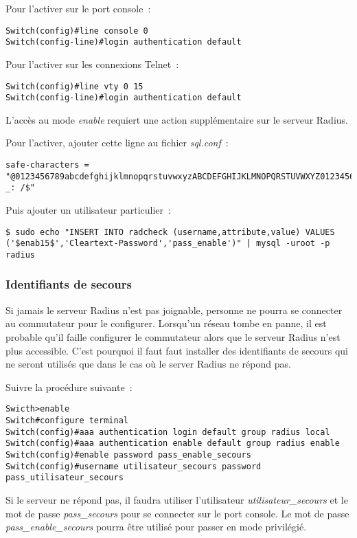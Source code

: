 Pour l'activer sur le port console~:

\begin{lstlisting}
Switch(config)#line console 0
Switch(config-line)#login authentication default
\end{lstlisting}

Pour l'activer sur les connexions Telnet~:

\begin{lstlisting}
Switch(config)#line vty 0 15
Switch(config-line)#login authentication default
\end{lstlisting}

L'accès au mode \textit{enable} requiert une action supplémentaire sur le serveur Radius.

Pour l'activer, ajouter cette ligne au fichier \textit{sql.conf}~:

\begin{lstlisting}
safe-characters = "@0123456789abcdefghijklmnopqrstuvwxyzABCDEFGHIJKLMNOPQRSTUVWXYZ0123456789.-_: /$"
\end{lstlisting}

Puis ajouter un utilisateur particulier~:

\begin{lstlisting}
$ sudo echo "INSERT INTO radcheck (username,attribute,value) VALUES ('$enab15$','Cleartext-Password','pass_enable')" | mysql -uroot -p radius
\end{lstlisting}

\subsubsection{Identifiants de secours}

Si jamais le serveur Radius n'est pas joignable, personne ne pourra se connecter au commutateur pour le configurer. Lorsqu'un réseau tombe en panne, il est probable qu'il faille configurer le commutateur alors que le serveur Radius n'est plus accessible. C'est pourquoi il faut faut installer des identifiants de secours qui ne seront utilisés que dans le cas où le server Radius ne répond pas.

Suivre la procédure suivante~:

\begin{lstlisting}
Swicth>enable
Switch#configure terminal
Switch(config)#aaa authentication login default group radius local
Switch(config)#aaa authentication enable default group radius enable
Switch(config)#enable password pass_enable_secours
Switch(config)#username utilisateur_secours password pass_utilisateur_secours
\end{lstlisting}

Si le serveur ne répond pas, il faudra utiliser l'utilisateur \emph{utilisateur\_secours} et le mot de passe \emph{pass\_secours} pour se connecter sur le port console. Le mot de passe \emph{pass\_enable\_secours} pourra être utilisé pour passer en mode privilégié.
